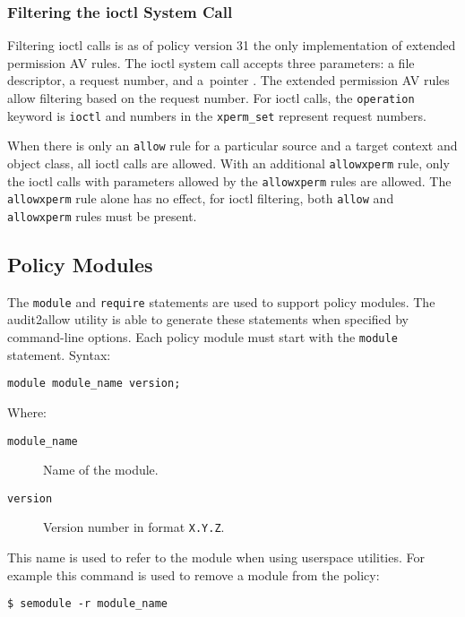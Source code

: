 \subsubsection{Filtering the ioctl System Call}
Filtering ioctl calls is as of policy version 31 the only implementation of
extended permission AV rules. The ioctl system call accepts three parameters:
a file descriptor, a request number, and a~pointer \cite{ioctl}. The extended
permission AV rules allow filtering based on the request number. For ioctl
calls, the \texttt{operation} keyword is \texttt{ioctl} and numbers in the
\texttt{xperm\_set} represent request numbers.

When there is only an \texttt{allow} rule for a particular source and a target
context and object class, all ioctl calls are allowed. With an additional
\texttt{allowxperm} rule, only the ioctl calls with parameters allowed by the
\texttt{allowxperm} rules are allowed. The \texttt{allowxperm} rule alone has no
effect, for ioctl filtering, both \texttt{allow} and \texttt{allowxperm} rules
must be present.

\subsection{Policy Modules}
\label{modules}

The \texttt{module} and \texttt{require} statements are used to support policy
modules. The audit2allow utility is able to generate these statements when
specified by command-line options. Each policy module must start with the
\texttt{module} statement. Syntax:
\begin{lstlisting}[language=te]
module module_name version;
\end{lstlisting}
Where:
\begin{description}
    \item [\texttt{module\_name}] Name of the module.
    \item [\texttt{version}] Version number in format \texttt{X.Y.Z}.
\end{description}
This name is used to refer to the module when using userspace utilities. For
example this command is used to remove a module from the policy:
\begin{lstlisting}
$ semodule -r module_name
\end{lstlisting}

